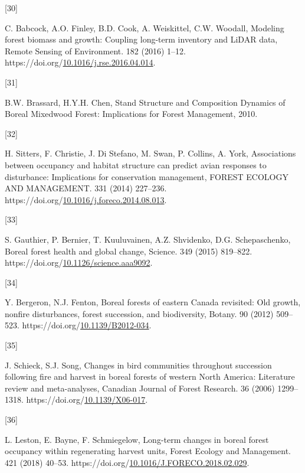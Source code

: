 \documentclass[manuscript, 3p, authoryear]{elsarticle} %
\newlength{\cslhangindent}
\newlength{\csllabelwidth}
\newlength{\cslentryspacingunit} %
\newenvironment{CSLReferences}[2] %
 {%
  \setlength{\parindent}{0pt}
  \ifodd #1
  \let\oldpar\par
  \def\par{\hangindent=\cslhangindent\oldpar}
  \fi
  \setlength{\parskip}{#2\cslentryspacingunit}
 }%
 {}
\newcommand{\CSLLeftMargin}[1]{\parbox[t]{\csllabelwidth}{#1}}
\newcommand{\CSLRightInline}[1]{\parbox[t]{\linewidth - \csllabelwidth}{#1}\break}
\begin{document}
\begin{CSLReferences}{0}{0}
\leavevmode{}%
\CSLLeftMargin{{[}30{]} }%
\CSLRightInline{C. Babcock, A.O. Finley, B.D. Cook, A. Weiskittel, C.W. Woodall, Modeling forest biomass and growth: {Coupling} long-term inventory and {LiDAR} data, Remote Sensing of Environment. 182 (2016) 1--12. https://doi.org/\href{https://doi.org/10.1016/j.rse.2016.04.014}{10.1016/j.rse.2016.04.014}.}

\leavevmode{}%
\CSLLeftMargin{{[}31{]} }%
\CSLRightInline{B.W. Brassard, H.Y.H. Chen, Stand {Structure} and {Composition Dynamics} of {Boreal Mixedwood Forest}: {Implications} for {Forest Management}, 2010.}

\leavevmode{}%
\CSLLeftMargin{{[}32{]} }%
\CSLRightInline{H. Sitters, F. Christie, J. Di Stefano, M. Swan, P. Collins, A. York, Associations between occupancy and habitat structure can predict avian responses to disturbance: {Implications} for conservation management, FOREST ECOLOGY AND MANAGEMENT. 331 (2014) 227--236. https://doi.org/\href{https://doi.org/10.1016/j.foreco.2014.08.013}{10.1016/j.foreco.2014.08.013}.}

\leavevmode{}%
\CSLLeftMargin{{[}33{]} }%
\CSLRightInline{S. Gauthier, P. Bernier, T. Kuuluvainen, A.Z. Shvidenko, D.G. Schepaschenko, Boreal forest health and global change, Science. 349 (2015) 819--822. https://doi.org/\href{https://doi.org/10.1126/science.aaa9092}{10.1126/science.aaa9092}.}

\leavevmode{}%
\CSLLeftMargin{{[}34{]} }%
\CSLRightInline{Y. Bergeron, N.J. Fenton, Boreal forests of eastern {Canada} revisited: {Old} growth, nonfire disturbances, forest succession, and biodiversity, Botany. 90 (2012) 509--523. https://doi.org/\href{https://doi.org/10.1139/B2012-034}{10.1139/B2012-034}.}

\leavevmode{}%
\CSLLeftMargin{{[}35{]} }%
\CSLRightInline{J. Schieck, S.J. Song, Changes in bird communities throughout succession following fire and harvest in boreal forests of western {North America}: {Literature} review and meta-analyses, Canadian Journal of Forest Research. 36 (2006) 1299--1318. https://doi.org/\href{https://doi.org/10.1139/X06-017}{10.1139/X06-017}.}

\leavevmode{}%
\CSLLeftMargin{{[}36{]} }%
\CSLRightInline{L. Leston, E. Bayne, F. Schmiegelow, Long-term changes in boreal forest occupancy within regenerating harvest units, Forest Ecology and Management. 421 (2018) 40--53. https://doi.org/\href{https://doi.org/10.1016/J.FORECO.2018.02.029}{10.1016/J.FORECO.2018.02.029}.}


\end{CSLReferences}
\end{document}
